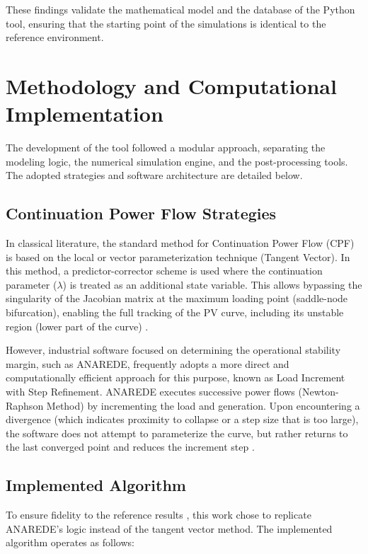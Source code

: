 \documentclass{ieeeaccess}
\begin{document}
These findings validate the mathematical model and the database of the Python tool, ensuring that the starting point of the simulations is identical to the reference environment.

\section{Methodology and Computational Implementation}
\label{sec:method}

The development of the tool followed a modular approach, separating the modeling logic, the numerical simulation engine, and the post-processing tools. The adopted strategies and software architecture are detailed below.

\subsection{Continuation Power Flow Strategies}
In classical literature, the standard method for Continuation Power Flow (CPF) is based on the local or vector parameterization technique (Tangent Vector). In this method, a predictor-corrector scheme is used where the continuation parameter ($\lambda$) is treated as an additional state variable. This allows bypassing the singularity of the Jacobian matrix at the maximum loading point (saddle-node bifurcation), enabling the full tracking of the PV curve, including its unstable region (lower part of the curve) \cite{kundur1994power}.

However, industrial software focused on determining the operational stability margin, such as ANAREDE, frequently adopts a more direct and computationally efficient approach for this purpose, known as Load Increment with Step Refinement. ANAREDE executes successive power flows (Newton-Raphson Method) by incrementing the load and generation. Upon encountering a divergence (which indicates proximity to collapse or a step size that is too large), the software does not attempt to parameterize the curve, but rather returns to the last converged point and reduces the increment step \cite{cepel2009anarede}.

\subsection{Implemented Algorithm}
To ensure fidelity to the reference results \cite{madureira2023avaliacao}, this work chose to replicate ANAREDE's logic instead of the tangent vector method. The implemented algorithm operates as follows:
\end{document}
